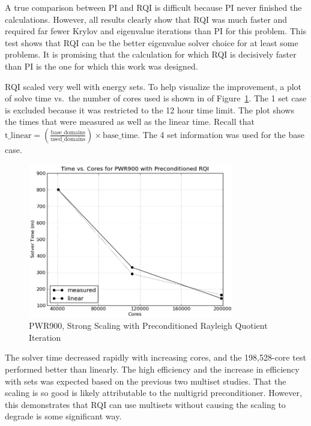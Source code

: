 A true comparison between PI and RQI is difficult because PI never finished the calculations. However, all results clearly show that RQI was much faster and required far fewer Krylov and eigenvalue iterations than PI for this problem. This test shows that RQI can be the better eigenvalue solver choice for at least some problems. It is promising that the calculation for which RQI is decisively faster than PI is the one for which this work was designed. 

RQI scaled very well with energy sets. To help visualize the improvement, a plot of solve time vs.\ the number of cores used is shown in of Figure~\ref{fig:PWRprecondRQI}. The 1 set case is excluded because it was restricted to the 12 hour time limit. The plot shows the times that were measured as well as the linear time. Recall that $\text{t\_linear} = (\frac{\text{base\_domains}}{\text{used\_domains}}) \times \text{base\_time}$. The 4 set information was used for the base case. 
%
\begin{figure}[!ht]
    \begin{center}
      \includegraphics [width=0.8\textwidth, height=0.5\textheight] {PWRPrecondRQI}
   \end{center}
   \caption{PWR900, Strong Scaling with Preconditioned Rayleigh Quotient Iteration}
   \label{fig:PWRprecondRQI}
\end{figure}

The solver time decreased rapidly with increasing cores, and the 198,528-core test performed better than linearly. %
The high efficiency and the increase in efficiency with sets was expected based on the previous two multiset studies. That the scaling is so good is likely attributable to the multigrid preconditioner. However, this demonstrates that RQI can use multisets without causing the scaling to degrade is some significant way. 

